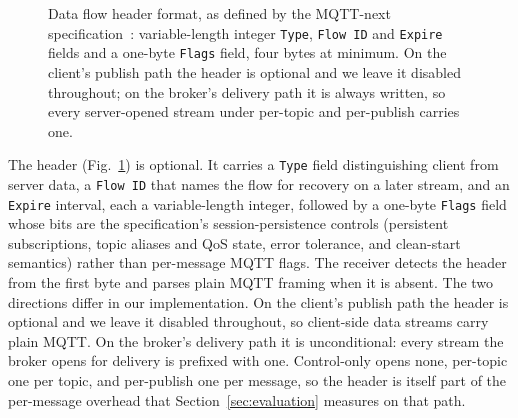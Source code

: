 \documentclass[a4paper,fleqn]{cas-dc}
\begin{document}
\begin{figure}
\centering
{}
\caption{Data flow header format, as defined by the MQTT-next specification~\cite{yang2024mqttnext}: variable-length integer \texttt{Type}, \texttt{Flow ID} and \texttt{Expire} fields and a one-byte \texttt{Flags} field, four bytes at minimum. On the client's publish path the header is optional and we leave it disabled throughout; on the broker's delivery path it is always written, so every server-opened stream under per-topic and per-publish carries one.}
\label{fig:flow-header}
\end{figure}

The header (Fig.~\ref{fig:flow-header}) is optional. It carries a \texttt{Type} field distinguishing client from server data, a \texttt{Flow ID} that names the flow for recovery on a later stream, and an \texttt{Expire} interval, each a variable-length integer, followed by a one-byte \texttt{Flags} field whose bits are the specification's session-persistence controls (persistent subscriptions, topic aliases and QoS state, error tolerance, and clean-start semantics) rather than per-message MQTT flags. The receiver detects the header from the first byte and parses plain MQTT framing when it is absent. The two directions differ in our implementation. On the client's publish path the header is optional and we leave it disabled throughout, so client-side data streams carry plain MQTT. On the broker's delivery path it is unconditional: every stream the broker opens for delivery is prefixed with one. Control-only opens none, per-topic one per topic, and per-publish one per message, so the header is itself part of the per-message overhead that Section~\ref{sec:evaluation} measures on that path.
\end{document}

